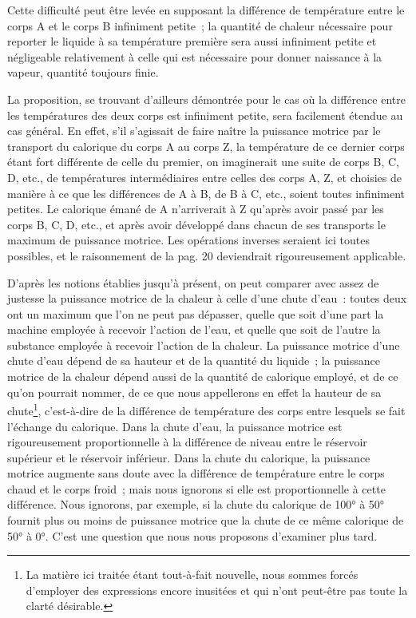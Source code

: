 \documentclass[french,twoside]{book} %
\begin{document}
Cette difficulté peut être levée en supposant la différence de température entre le corps A et le corps B infiniment petite ; la quantité de chaleur nécessaire pour reporter le liquide à sa température première sera aussi infiniment petite et négligeable relativement à celle qui est nécessaire pour donner naissance à la vapeur, quantité toujours finie.\par
La proposition, se trouvant d’ailleurs démontrée pour le cas où la différence entre les températures des deux corps est infiniment petite, sera facilement étendue au cas général. En effet, s’il s’agissait de faire naître la puissance motrice par le transport du calorique du corps A au corps Z, la température de ce dernier corps étant fort différente de celle du premier, on imaginerait une suite de corps B, C, D, etc., de températures intermédiaires entre celles des corps A, Z, et choisies de manière à ce que les différences de A à B, de B à C, etc., soient toutes infiniment petites. Le calorique émané de A n’arriverait à Z qu’après avoir passé par les corps B, C, D, etc., et après avoir développé dans chacun de ses transports le maximum de puissance motrice. Les opérations inverses seraient ici toutes possibles, et le raisonnement de la pag. 20 deviendrait rigoureusement applicable.\par
D’après les notions établies jusqu’à présent, on peut comparer avec assez de justesse la puissance motrice de la chaleur à celle d’une chute d’eau : toutes deux ont un maximum que l’on ne peut pas dépasser, quelle que soit d’une part la machine employée à recevoir l’action de l’eau, et quelle que soit de l’autre la substance employée à recevoir l’action de la chaleur. La puissance motrice d’une chute d’eau dépend de sa hauteur et de la quantité du liquide ; la puissance motrice de la chaleur dépend aussi de la quantité de calorique employé, et de ce qu’on pourrait nommer, de ce que nous appellerons en effet la hauteur de sa chute\footnote{La matière ici traitée étant tout-à-fait nouvelle, nous sommes forcés d’employer des expressions encore inusitées et qui n’ont peut-être pas toute la clarté désirable.}, c’est-à-dire de la différence de température des corps entre lesquels se fait l’échange du calorique. Dans la chute d’eau, la puissance motrice est rigoureusement proportionnelle à la différence de niveau entre le réservoir supérieur et le réservoir inférieur. Dans la chute du calorique, la puissance motrice augmente sans doute avec la différence de température entre le corps chaud et le corps froid ; mais nous ignorons si elle est proportionnelle à cette différence. Nous ignorons, par exemple, si la chute du calorique de 100° à 50° fournit plus ou moins de puissance motrice que la chute de ce même calorique de 50° à 0°. C’est une question que nous nous proposons d’examiner plus tard.\par
\end{document}
